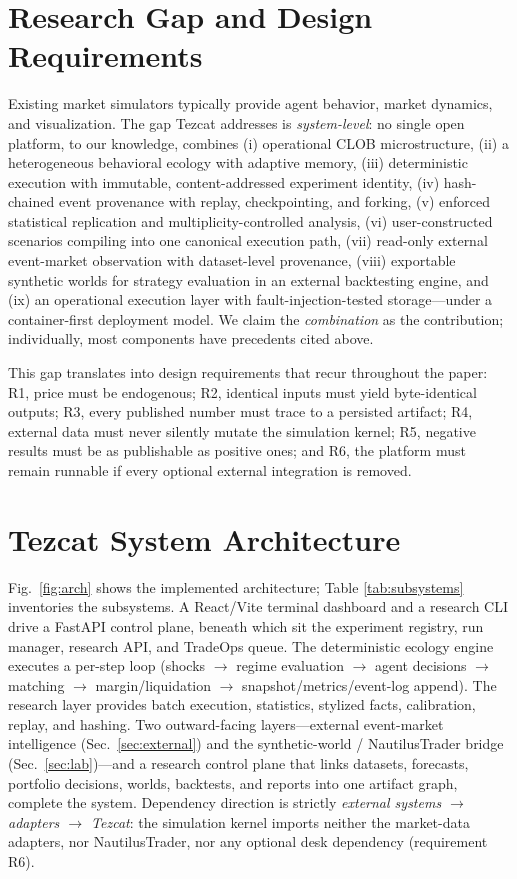 \documentclass[conference]{IEEEtran}
\newcommand{\tez}{Tezcat}
\begin{document}
\section{Research Gap and Design Requirements}
\label{sec:gap}
Existing market simulators typically provide agent behavior, market
dynamics, and visualization. The gap \tez{} addresses is
\emph{system-level}: no single open platform, to our knowledge,
combines (i) operational CLOB microstructure, (ii) a heterogeneous
behavioral ecology with adaptive memory, (iii) deterministic execution
with immutable, content-addressed experiment identity, (iv) hash-chained
event provenance with replay, checkpointing, and forking, (v) enforced
statistical replication and multiplicity-controlled analysis, (vi)
user-constructed scenarios compiling into one canonical execution path,
(vii) read-only external event-market observation with dataset-level
provenance, (viii) exportable synthetic worlds for strategy evaluation
in an external backtesting engine, and (ix) an operational execution
layer with fault-injection-tested storage---under a container-first
deployment model. We claim the \emph{combination} as the contribution;
individually, most components have precedents cited above.

This gap translates into design requirements that recur throughout the
paper: R1, price must be endogenous; R2, identical inputs must yield
byte-identical outputs; R3, every published number must trace to a
persisted artifact; R4, external data must never silently mutate the
simulation kernel; R5, negative results must be as publishable as
positive ones; and R6, the platform must remain runnable if every
optional external integration is removed.

\section{\tez{} System Architecture}
\label{sec:arch}
Fig.~\ref{fig:arch} shows the implemented architecture; Table
\ref{tab:subsystems} inventories the subsystems. A React/Vite terminal
dashboard and a research CLI drive a FastAPI control plane, beneath
which sit the experiment registry, run manager, research API, and
TradeOps queue. The deterministic ecology engine executes a per-step
loop (shocks $\rightarrow$ regime evaluation $\rightarrow$ agent
decisions $\rightarrow$ matching $\rightarrow$ margin/liquidation
$\rightarrow$ snapshot/metrics/event-log append). The research layer
provides batch execution, statistics, stylized facts, calibration,
replay, and hashing. Two outward-facing layers---external event-market
intelligence (Sec.~\ref{sec:external}) and the synthetic-world /
NautilusTrader bridge (Sec.~\ref{sec:lab})---and a research control
plane that links datasets, forecasts, portfolio decisions, worlds,
backtests, and reports into one artifact graph, complete the system.
Dependency direction is strictly \emph{external systems $\rightarrow$
adapters $\rightarrow$ \tez{}}: the simulation kernel imports neither
the market-data adapters, nor NautilusTrader, nor any optional desk
dependency (requirement R6).
\end{document}
